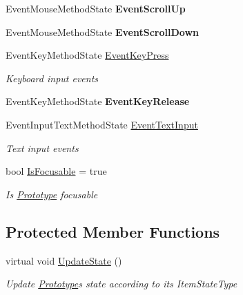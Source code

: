 \begin{DoxyCompactItemize}
Event\+Mouse\+Method\+State {\bfseries Event\+Scroll\+Up}
\item 
\mbox{\label{class_space_v_i_l_1_1_prototype_a806ab37b05e7328bb929fa748f12f908}} 
Event\+Mouse\+Method\+State {\bfseries Event\+Scroll\+Down}
\item 
Event\+Key\+Method\+State \mbox{\hyperlink{class_space_v_i_l_1_1_prototype_af974f404a58d925f4db7b6c31bf8bbfc}{Event\+Key\+Press}}
\begin{DoxyCompactList}\small\item\em Keyboard input events \end{DoxyCompactList}\item 
\mbox{\label{class_space_v_i_l_1_1_prototype_a6d01c54675c22b38f77ba716b77ac94d}} 
Event\+Key\+Method\+State {\bfseries Event\+Key\+Release}
\item 
Event\+Input\+Text\+Method\+State \mbox{\hyperlink{class_space_v_i_l_1_1_prototype_a582dbed570a2eea18c616d0994549a08}{Event\+Text\+Input}}
\begin{DoxyCompactList}\small\item\em Text input events \end{DoxyCompactList}\item 
bool \mbox{\hyperlink{class_space_v_i_l_1_1_prototype_acae2b941788e7a8e8c3a80fd1a4aa376}{Is\+Focusable}} = true
\begin{DoxyCompactList}\small\item\em Is \mbox{\hyperlink{class_space_v_i_l_1_1_prototype}{Prototype}} focusable \end{DoxyCompactList}\end{DoxyCompactItemize}
\subsection*{Protected Member Functions}
\begin{DoxyCompactItemize}
\item 
virtual void \mbox{\hyperlink{class_space_v_i_l_1_1_prototype_ae2a88a91dcf919d9d945d55996b2f896}{Update\+State}} ()
\begin{DoxyCompactList}\small\item\em Update \mbox{\hyperlink{class_space_v_i_l_1_1_prototype}{Prototype}}\textquotesingle{}s state according to its Item\+State\+Type \end{DoxyCompactList}\end{DoxyCompactItemize}


